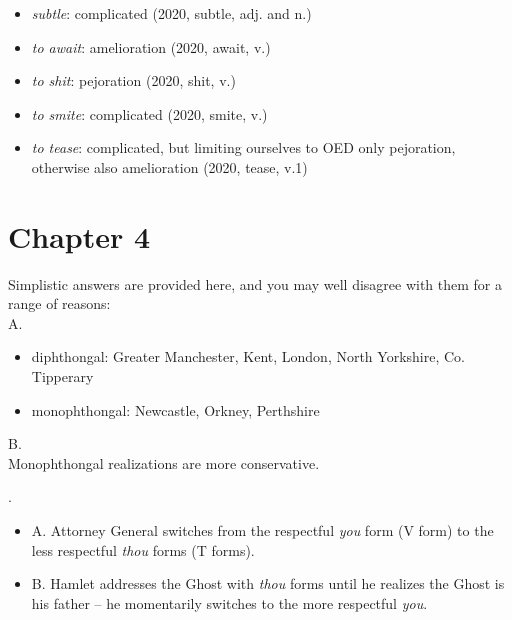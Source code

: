\begin{itemize}
    \item \textit{subtle}: complicated (2020,  subtle, adj. and n.)
    \item \textit{to await}: amelioration (2020,  await, v.)
    \item \textit{to shit}: pejoration (2020,  shit, v.)
    \item \textit{to smite}: complicated (2020,  smite, v.)
    \item \textit{to tease}: complicated, but limiting ourselves to OED only pejoration, otherwise also amelioration (2020,  tease, v.1)
\end{itemize}


\section*{Chapter 4}

\noindent\textbf{}

\noindent Simplistic answers are provided here, and you may well disagree with them for a range of reasons:\\

\noindent A.
\begin{itemize}
    \item diphthongal: Greater Manchester, Kent, London, North Yorkshire, Co. Tipperary
    \item monophthongal: Newcastle, Orkney, Perthshire
\end{itemize}

\noindent B.\\
\noindent Monophthongal realizations are more conservative.\\


\noindent\textbf{}

.
\begin{itemize}
    \item A. Attorney General switches from the respectful \textit{you} form (V form) to the less respectful \textit{thou} forms (T forms).
    \item B. Hamlet addresses the Ghost with \textit{thou} forms until he realizes the Ghost is his father -- he momentarily switches to the more respectful \textit{you}.
\end{itemize}



